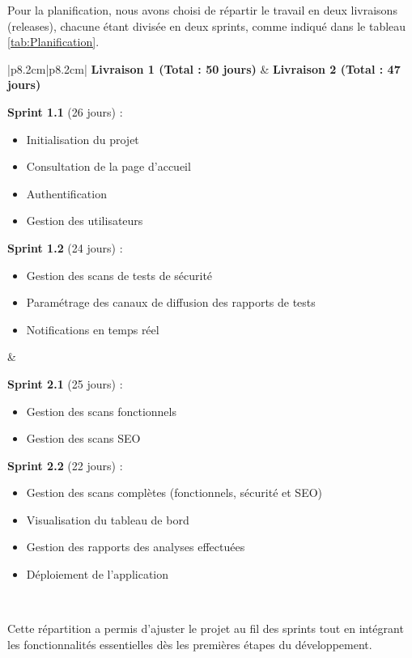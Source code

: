 Pour la planification, nous avons choisi de répartir le travail en deux livraisons (releases), chacune étant divisée en deux sprints, comme indiqué dans le tableau \ref{tab:Planification}.
{\renewcommand{\arraystretch}{1.3}
\begin{table}[H]
	\begin{center}
    \caption{Planification des Livraisons et des Sprints}
    \label{tab:Planification}
	\begin{tabular}{|p{8.2cm}|p{8.2cm}|}\hline
		\textbf{Livraison 1 (Total : 50 jours)} & \textbf{Livraison 2 (Total : 47 jours)} \\\hline
		\begin{minipage}[t]{\linewidth}
            \textbf{Sprint 1.1} (26 jours) :
            \begin{itemize}[label=$-$, left=0.2cm]
                \item Initialisation du projet
                \item Consultation de la page d’accueil
                \item Authentification
                \item Gestion des utilisateurs
            \end{itemize}
            \textbf{Sprint 1.2} (24 jours) :
            \begin{itemize}[label=$-$, left=0.2cm]
                \item Gestion des scans de tests de sécurité
                \item Paramétrage des canaux de diffusion des rapports de tests
                \item Notifications en temps réel
            \end{itemize}
            \vspace{0.1cm}
        \end{minipage}
        &
        \begin{minipage}[t]{\linewidth}
            \textbf{Sprint 2.1} (25 jours) :
            \begin{itemize}[label=$-$, left=0.2cm]
                \item Gestion des scans fonctionnels
                \item Gestion des scans SEO
            \end{itemize}
            \textbf{Sprint 2.2} (22 jours) :
            \begin{itemize}[label=$-$, left=0.2cm]
                \item Gestion des scans complètes (fonctionnels, sécurité et SEO)
                \item Visualisation du tableau de bord
                \item Gestion des rapports des analyses effectuées
                \item Déploiement de l’application
            \end{itemize}
        \end{minipage}
        \\\hline
	\end{tabular}
 	\end{center}
\end{table}
}
\vspace{-0.7cm}
Cette répartition a permis d’ajuster le projet au fil des sprints tout en intégrant les fonctionnalités essentielles dès les premières étapes du développement.
